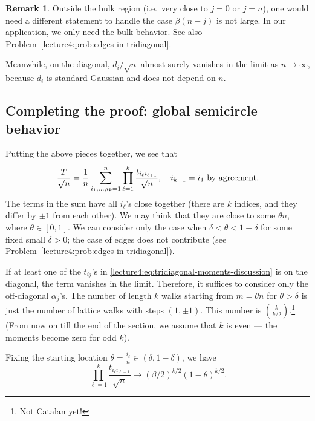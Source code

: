 \documentclass[letterpaper,11pt,oneside,reqno]{book}
\numberwithin{equation}{chapter}  %
\theoremstyle{definition}
\newtheorem{remark}[proposition]{Remark}
\begin{document}
\begin{remark}
Outside the bulk region (i.e.\ very close to $j=0$ or $j=n$), one would need a different statement to handle the case $\beta(n-j)$ is not large.
In our application, we only need the bulk behavior.
See also Problem~\ref{lecture4:prob:edges-in-tridiagonal}.
\end{remark}

Meanwhile, on the diagonal, $d_i/\sqrt{n}$
almost surely vanishes in the limit as $n\to\infty$,
because $d_i$ is standard Gaussian and does not depend on $n$.



\subsection{Completing the proof: global semicircle behavior}

Putting the above pieces together, we see that
\begin{equation}
	\label{lecture4:eq:tridiagonal-moments-discussion}
	\frac{T}{\sqrt n}=
	\frac{1}{n}
	\sum_{i_1,\dots,i_k=1}^n
	\prod_{\ell=1}^k
	\frac{t_{i_\ell i_{\ell+1}}}{\sqrt n},\quad
	i_{k+1}=i_1 \textnormal{ by agreement}.
\end{equation}
The terms in the sum have all $i_{\ell}$'s close together
(there are $k$ indices, and they differ by $\pm1$ from each other).
We
may think that they are close to some $\theta n$, where $\theta\in [0,1]$.
We can consider only the case when $\delta<\theta<1-\delta$ for some fixed small $\delta>0$;
the case of edges does not contribute (see Problem~\ref{lecture4:prob:edges-in-tridiagonal}).

If at least one of the $t_{ij}$'s in \eqref{lecture4:eq:tridiagonal-moments-discussion} is
on the diagonal, the term vanishes in the limit. Therefore,
it suffices to consider only the off-diagonal $\alpha_j$'s. The
number of length $k$ walks starting from $m=\theta n$ for $\theta>\delta$ is
just the number of lattice walks with steps $(1,\pm 1)$. This number is $\binom{k}{k/2}$.\footnote{Not Catalan yet!}
(From now on till the end of the section, we assume that
$k$ is even --- the moments become zero for odd $k$).

Fixing the starting location $\theta=\frac{i_\ell}{n}\in(\delta,1-\delta)$, we have
\begin{equation*}
	\prod_{\ell=1}^k
	\frac{t_{i_\ell i_{\ell+1}}}{\sqrt n}\to (\beta/2)^{k/2}(1-\theta)^{k/2}.
\end{equation*}
\end{document}
